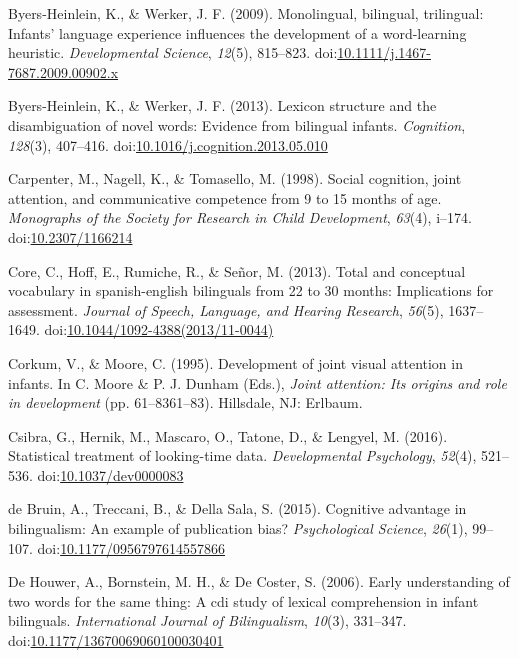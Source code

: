 \documentclass[,man,floatsintext]{apa6}
\begin{document}
\leavevmode\hypertarget{ref-Byers-Heinlein_Werker_2009}{}%
Byers-Heinlein, K., \& Werker, J. F. (2009). Monolingual, bilingual, trilingual: Infants' language experience influences the development of a word-learning heuristic. \emph{Developmental Science}, \emph{12}(5), 815--823. doi:\href{https://doi.org/10.1111/j.1467-7687.2009.00902.x}{10.1111/j.1467-7687.2009.00902.x}

\leavevmode\hypertarget{ref-Byers-Heinlein_Werker_2013}{}%
Byers-Heinlein, K., \& Werker, J. F. (2013). Lexicon structure and the disambiguation of novel words: Evidence from bilingual infants. \emph{Cognition}, \emph{128}(3), 407--416. doi:\href{https://doi.org/10.1016/j.cognition.2013.05.010}{10.1016/j.cognition.2013.05.010}

\leavevmode\hypertarget{ref-Carpenter_etal_1998}{}%
Carpenter, M., Nagell, K., \& Tomasello, M. (1998). Social cognition, joint attention, and communicative competence from 9 to 15 months of age. \emph{Monographs of the Society for Research in Child Development}, \emph{63}(4), i--174. doi:\href{https://doi.org/10.2307/1166214}{10.2307/1166214}

\leavevmode\hypertarget{ref-Core_etal_2013}{}%
Core, C., Hoff, E., Rumiche, R., \& Señor, M. (2013). Total and conceptual vocabulary in spanish-english bilinguals from 22 to 30 months: Implications for assessment. \emph{Journal of Speech, Language, and Hearing Research}, \emph{56}(5), 1637--1649. doi:\href{https://doi.org/10.1044/1092-4388(2013/11-0044)}{10.1044/1092-4388(2013/11-0044)}

\leavevmode\hypertarget{ref-Corkum_Moore_1995}{}%
Corkum, V., \& Moore, C. (1995). Development of joint visual attention in infants. In C. Moore \& P. J. Dunham (Eds.), \emph{Joint attention: Its origins and role in development} (pp. 61--8361--83). Hillsdale, NJ: Erlbaum.

\leavevmode\hypertarget{ref-Csibra_etal_2016}{}%
Csibra, G., Hernik, M., Mascaro, O., Tatone, D., \& Lengyel, M. (2016). Statistical treatment of looking-time data. \emph{Developmental Psychology}, \emph{52}(4), 521--536. doi:\href{https://doi.org/10.1037/dev0000083}{10.1037/dev0000083}

\leavevmode\hypertarget{ref-deBruin_etal_2015}{}%
de Bruin, A., Treccani, B., \& Della Sala, S. (2015). Cognitive advantage in bilingualism: An example of publication bias? \emph{Psychological Science}, \emph{26}(1), 99--107. doi:\href{https://doi.org/10.1177/0956797614557866}{10.1177/0956797614557866}

\leavevmode\hypertarget{ref-DeHouwer_etal_2006}{}%
De Houwer, A., Bornstein, M. H., \& De Coster, S. (2006). Early understanding of two words for the same thing: A cdi study of lexical comprehension in infant bilinguals. \emph{International Journal of Bilingualism}, \emph{10}(3), 331--347. doi:\href{https://doi.org/10.1177/13670069060100030401}{10.1177/13670069060100030401}
\end{document}
